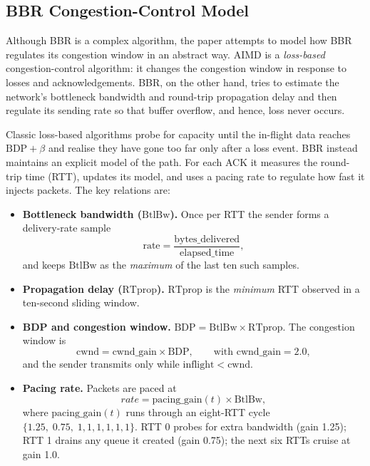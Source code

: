 \documentclass[12pt]{l4dc2023}
\begin{document}
\subsection{BBR Congestion-Control Model}\label{BBR}
Although BBR is a complex algorithm, the paper attempts to model how BBR regulates its congestion window in an abstract way.  AIMD is a \emph{loss-based} congestion-control algorithm: it changes the congestion window in response to losses and acknowledgements.  BBR, on the other hand, tries to estimate the network's bottleneck bandwidth and round-trip propagation delay and then regulate its sending rate so that buffer overflow, and hence, loss never occurs. 

Classic loss-based algorithms probe for capacity until the in-flight data reaches \(\text{BDP}+\beta\) and realise they have gone too far only after a loss event. BBR instead maintains an explicit model of the path. For 
each ACK it measures the round-trip time (RTT), updates its model, and uses a pacing rate to regulate how fast it injects packets. The key relations are:

\begin{itemize}
\item \textbf{Bottleneck bandwidth (\(\text{BtlBw}\)).}  
  Once per RTT the sender forms a delivery-rate sample  
  \[
    \text{rate}
      =\frac{\text{bytes\_delivered}}{\text{elapsed\_time}},
  \]
  and keeps \(\text{BtlBw}\) as the \emph{maximum} of the last ten such
  samples.

\item \textbf{Propagation delay (\(\text{RTprop}\)).}  
  \(\text{RTprop}\) is the \emph{minimum} RTT observed in a
  ten-second sliding window.

\item \textbf{BDP and congestion window.}  
  \(\displaystyle\text{BDP}=\text{BtlBw}\times\text{RTprop}\).  
  The congestion window is
  \[
    \mathrm{cwnd}= \text{cwnd\_gain}\times\text{BDP},
    \qquad\text{with }\text{cwnd\_gain}=2.0,
  \]
  and the sender transmits only while
  \(\text{inflight}<\mathrm{cwnd}\).

\item \textbf{Pacing rate.}  
  Packets are paced at
  \[
     rate= \text{pacing\_gain}(t)\times\text{BtlBw},
  \]
  where \(\text{pacing\_gain}(t)\) runs through an eight-RTT cycle  
  \(\{1.25,\;0.75,\;1,1,1,1,1,1\}\).  
  RTT 0 probes for extra bandwidth (gain 1.25); RTT 1 drains any queue it created (gain 0.75); the next six RTTs cruise at gain 1.0.
\end{itemize}
\end{document}
